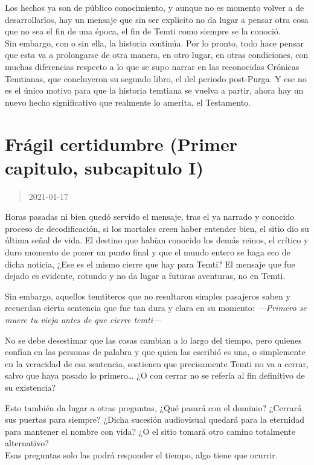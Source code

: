 \documentclass[
  spanish,
]{book}
\begin{document}
Los hechos ya son de público conocimiento, y aunque no es momento volver a de desarrollarlos, hay un mensaje que sin ser explicito no da lugar a pensar otra cosa que no sea el fin de una época, el fin de Temti como siempre se la conoció.\\
Sin embargo, con o sin ella, la historia continúa. Por lo pronto, todo hace pensar que esta va a prolongarse de otra manera, en otro lugar, en otras condiciones, con muchas diferencias respecto a lo que se supo narrar en las reconocidas Crónicas Temtianas, que concluyeron su segundo libro, el del periodo post-Purga. Y ese no es el único motivo para que la historia temtiana se vuelva a partir, ahora hay un nuevo hecho significativo que realmente lo amerita, el Testamento.

\hypertarget{fruxe1gil-certidumbre-primer-capitulo-subcapitulo-i}{%
\section{Frágil certidumbre (Primer capitulo, subcapitulo I)}\label{fruxe1gil-certidumbre-primer-capitulo-subcapitulo-i}}

\begin{quote}
2021-01-17
\end{quote}

Horas pasadas ni bien quedó servido el mensaje, tras el ya narrado y conocido proceso de decodificación, si los mortales creen haber entender bien, el sitio dio su última señal de vida.
El destino que habían conocido los demás reinos, el crítico y duro momento de poner un punto final y que el mundo entero se haga eco de dicha noticia, ¿Ese es el mismo cierre que hay para Temti?
El mensaje que fue dejado es evidente, rotundo y no da lugar a futuras aventuras, no en Temti.

Sin embargo, aquellos temtiteros que no resultaron simples pasajeros saben y recuerdan cierta sentencia que fue tan dura y clara en su momento: \emph{---Primero se muere tu vieja antes de que cierre temti---}

No se debe desestimar que las cosas cambian a lo largo del tiempo, pero quienes confían en las personas de palabra y que quien las escribió es una, o simplemente en la veracidad de esa sentencia, sostienen que precisamente Temti no va a cerrar, salvo que haya pasado lo primero\ldots{} ¿O con cerrar no se refería al fin definitivo de su existencia?

Esto también da lugar a otras preguntas, ¿Qué pasará con el dominio? ¿Cerrará sus puertas para siempre? ¿Dicha sucesión audiovisual quedará para la eternidad para mantener el nombre con vida? ¿O el sitio tomará otro camino totalmente alternativo?\\
Esas preguntas solo las podrá responder el tiempo, algo tiene que ocurrir.
\end{document}
